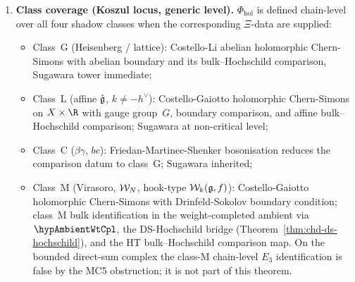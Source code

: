 \begin{theorem}
\begin{enumerate}[label=\textup{(\roman*)}]
 Drinfeld--Sokolov reduction, the square
 \[
 \begin{array}{c}
 \ChirAlg^{\omega,\mathrm{BL,adm},\Xi}_X(V_k(\fg))
 \;\xrightarrow{\;\DS_f\;}\;
 \ChirAlg^{\omega,\mathrm{BL,adm},\Xi}_X(\cW_k(\fg, f))
 \\
 {\scriptstyle \Phi_{\mathrm{hol}}} \downarrow \qquad\qquad\qquad\qquad
 \downarrow {\scriptstyle \Phi_{\mathrm{hol}}}
 \\
 \HTQFT^\Xi_{X \times \R}(T_{V_k(\fg),\Xi})
 \;\xrightarrow{\;\DS_f^{\mathrm{bulk}}\;}\;
 \HTQFT^\Xi_{X \times \R}(T_{\cW_k(\fg,f),\Xi})
 \end{array}
 \]
 commutes up to a natural isomorphism of functors, compatible with
 the DS-Hochschild bridge of Theorem~\ref*{thm:chd-ds-hochschild}.
\item \textbf{Class coverage (Koszul locus, generic level).}
 $\Phi_{\mathrm{hol}}$ is defined chain-level over all four shadow
 classes when the corresponding \(\Xi\)-data are supplied:
 \begin{itemize}[leftmargin=1.2em]
 \item Class~G (Heisenberg / lattice): Costello-Li abelian
 holomorphic Chern-Simons with abelian boundary and its
 bulk--Hochschild comparison, Sugawara tower immediate;
 \item Class~L (affine $\hat{\mathfrak{g}}$, $k \neq -h^\vee$):
 Costello-Gaiotto holomorphic Chern-Simons on $X \times \R$ with
 gauge group~$G$, boundary comparison, and affine
 bulk--Hochschild comparison; Sugawara at non-critical level;
 \item Class~C ($\beta\gamma$, $bc$): Friedan-Martinec-Shenker
 bosonisation reduces the comparison datum to class~G; Sugawara
 inherited;
 \item Class~M (Virasoro, $\mathcal{W}_N$, hook-type $\mathcal{W}_k(\mathfrak{g}, f)$):
 Costello-Gaiotto holomorphic Chern-Simons with
 Drinfeld-Sokolov boundary condition; class~M bulk identification
 in the weight-completed ambient via
 \(\hypAmbientWtCpl\), the DS-Hochschild bridge
 (Theorem~\ref*{thm:chd-ds-hochschild}), and the HT
 bulk--Hochschild comparison map. On the bounded direct-sum complex
 the class-M chain-level $E_3$ identification is false by the MC5
 obstruction; it is not part of this theorem.
 \end{itemize}
\end{enumerate}
\end{theorem}

